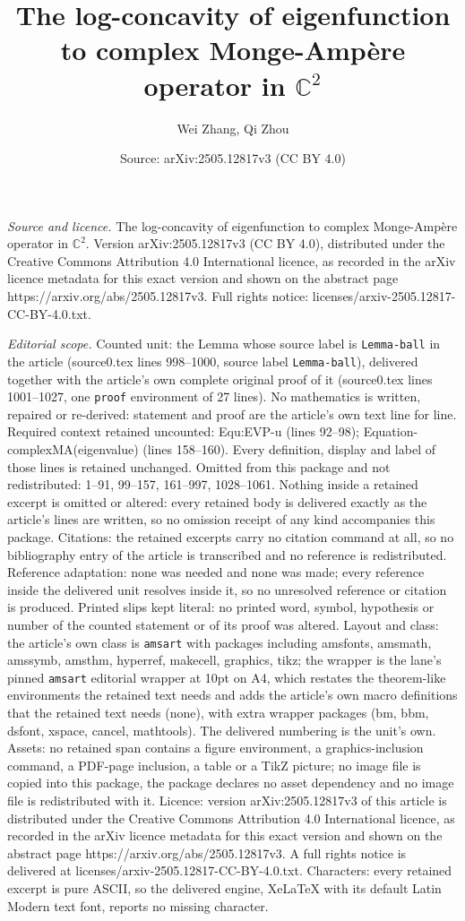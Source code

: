 \documentclass[10pt,a4paper]{amsart}
\title[The log-concavity of eigenfunction to complex Monge-Amp\`ere]{The log-concavity of eigenfunction to complex Monge-Amp\`ere operator in $\mathbb{C}^2$}
\author{Wei Zhang, Qi Zhou}
\date{Source: arXiv:2505.12817v3 (CC BY 4.0)}
\begin{document}
\maketitle

\noindent\emph{Source and licence.} The log-concavity of eigenfunction to complex Monge-Amp\`ere operator in $\mathbb{C}^2$. Version arXiv:2505.12817v3 (CC BY 4.0), distributed under the Creative Commons Attribution 4.0 International licence, as recorded in the arXiv licence metadata for this exact version and shown on the abstract page https://arxiv.org/abs/2505.12817v3. Full rights notice: licenses/arxiv-2505.12817-CC-BY-4.0.txt.\par\smallskip

\noindent\textit{Editorial scope.} Counted unit: the Lemma whose source label is \texttt{Lemma-ball} in the article (source0.tex lines 998--1000, source label \texttt{Lemma-ball}), delivered together with the article's own complete original proof of it (source0.tex lines 1001--1027, one \texttt{proof} environment of 27 lines). No mathematics is written, repaired or re-derived: statement and proof are the article's own text line for line. Required context retained uncounted: Equ:EVP-u (lines 92--98); Equation-complexMA(eigenvalue) (lines 158--160). Every definition, display and label of those lines is retained unchanged. Omitted from this package and not redistributed: 1--91, 99--157, 161--997, 1028--1061. Nothing inside a retained excerpt is omitted or altered: every retained body is delivered exactly as the article's lines are written, so no omission receipt of any kind accompanies this package. Citations: the retained excerpts carry no citation command at all, so no bibliography entry of the article is transcribed and no reference is redistributed. Reference adaptation: none was needed and none was made; every reference inside the delivered unit resolves inside it, so no unresolved reference or citation is produced. Printed slips kept literal: no printed word, symbol, hypothesis or number of the counted statement or of its proof was altered. Layout and class: the article's own class is \texttt{amsart} with packages including amsfonts, amsmath, amssymb, amsthm, hyperref, makecell, graphics, tikz; the wrapper is the lane's pinned \texttt{amsart} editorial wrapper at 10pt on A4, which restates the theorem-like environments the retained text needs and adds the article's own macro definitions that the retained text needs (none), with extra wrapper packages (bm, bbm, dsfont, xspace, cancel, mathtools). The delivered numbering is the unit's own. Assets: no retained span contains a figure environment, a graphics-inclusion command, a PDF-page inclusion, a table or a TikZ picture; no image file is copied into this package, the package declares no asset dependency and no image file is redistributed with it. Licence: version arXiv:2505.12817v3 of this article is distributed under the Creative Commons Attribution 4.0 International licence, as recorded in the arXiv licence metadata for this exact version and shown on the abstract page https://arxiv.org/abs/2505.12817v3. A full rights notice is delivered at licenses/arxiv-2505.12817-CC-BY-4.0.txt. Characters: every retained excerpt is pure ASCII, so the delivered engine, XeLaTeX with its default Latin Modern text font, reports no missing character.
\end{document}
